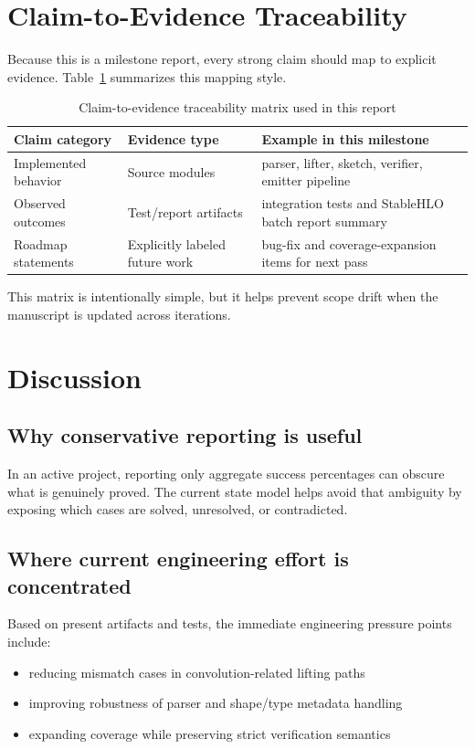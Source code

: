 \documentclass[conference]{IEEEtran}
\begin{document}
\section{Claim-to-Evidence Traceability}
Because this is a milestone report, every strong claim should map to explicit evidence. Table~\ref{tab:traceability_matrix} summarizes this mapping style.

\begin{table}[t]
\caption{Claim-to-evidence traceability matrix used in this report}
\label{tab:traceability_matrix}
\centering
\footnotesize
\begin{tabular}{p{}p{}p{}}
\toprule
Claim category & Evidence type & Example in this milestone \\
\midrule
Implemented behavior & Source modules & parser, lifter, sketch, verifier, emitter pipeline \\
Observed outcomes & Test/report artifacts & integration tests and StableHLO batch report summary \\
Roadmap statements & Explicitly labeled future work & bug-fix and coverage-expansion items for next pass \\
\bottomrule
\end{tabular}
\end{table}

This matrix is intentionally simple, but it helps prevent scope drift when the manuscript is updated across iterations.

\section{Discussion}
\subsection{Why conservative reporting is useful}
In an active project, reporting only aggregate success percentages can obscure what is genuinely proved. The current state model helps avoid that ambiguity by exposing which cases are solved, unresolved, or contradicted.

\subsection{Where current engineering effort is concentrated}
Based on present artifacts and tests, the immediate engineering pressure points include:
\begin{itemize}
\item reducing mismatch cases in convolution-related lifting paths
\item improving robustness of parser and shape/type metadata handling
\item expanding coverage while preserving strict verification semantics
\end{itemize}
\end{document}

